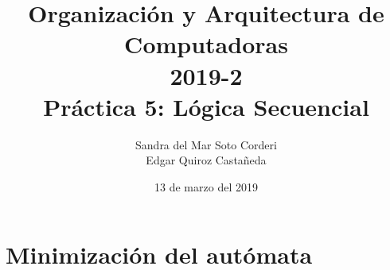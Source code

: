 \documentclass{article}
\begin{document}
    \title{
        Organización y Arquitectura de Computadoras \\
        2019-2 \\
        Práctica 5: Lógica Secuencial
    }
    \author{
        Sandra del Mar Soto Corderi \\
        Edgar Quiroz Castañeda
    }
    \date{
        13 de marzo del 2019
    }

    \maketitle
    
    \section{Minimización del autómata}
    
\end{document}
